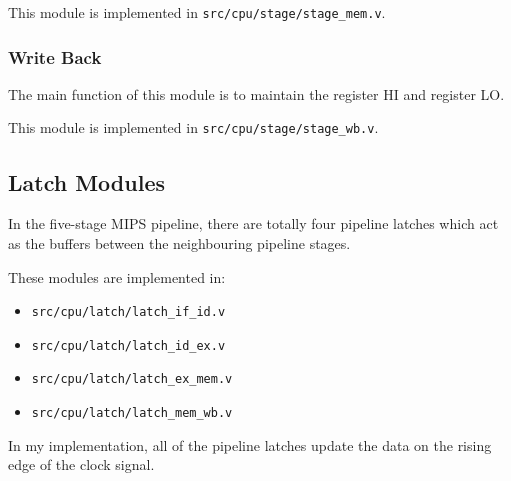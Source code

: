 \documentclass{article}
\begin{document}
This module is implemented in \texttt{src/cpu/stage/stage\_mem.v}.

\newpage
\subsubsection{Write Back}
The main function of this module is to maintain the register HI and register LO.


This module is implemented in \texttt{src/cpu/stage/stage\_wb.v}.

\subsection{Latch Modules}
In the five-stage MIPS pipeline, there are totally four pipeline latches which act as the buffers between the neighbouring pipeline stages. 

These modules are implemented in:
\begin{itemize}
\item
\texttt{src/cpu/latch/latch\_if\_id.v}
\item
\texttt{src/cpu/latch/latch\_id\_ex.v}
\item
\texttt{src/cpu/latch/latch\_ex\_mem.v}
\item
\texttt{src/cpu/latch/latch\_mem\_wb.v}
\end{itemize}
In my implementation, all of the pipeline latches update the data on the rising edge of the clock signal.

%

%
%

\end{document}
